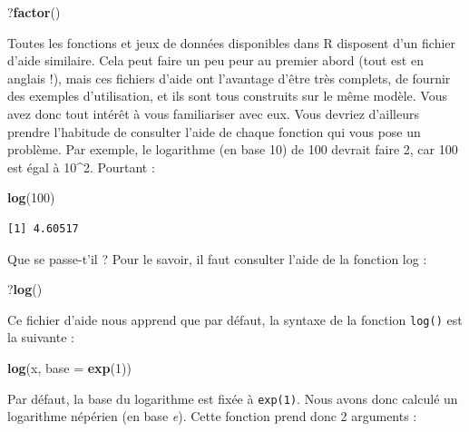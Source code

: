 \documentclass[
  a4paper,
]{article}
\newenvironment{Shaded}{\begin{snugshade}}{\end{snugshade}}
\newcommand{\DataTypeTok}[1]{\textcolor[rgb]{0.00,0.34,0.68}{#1}}
\newcommand{\DecValTok}[1]{\textcolor[rgb]{0.69,0.50,0.00}{#1}}
\newcommand{\KeywordTok}[1]{\textcolor[rgb]{0.12,0.11,0.11}{\textbf{#1}}}
\newcommand{\NormalTok}[1]{\textcolor[rgb]{0.12,0.11,0.11}{#1}}
\begin{document}
\begin{Shaded}
\begin{Highlighting}[]
\NormalTok{?}\KeywordTok{factor}\NormalTok{()}
\end{Highlighting}
\end{Shaded}

Toutes les fonctions et jeux de données disponibles dans R disposent d'un fichier d'aide similaire. Cela peut faire un peu peur au premier abord (tout est en anglais !), mais ces fichiers d'aide ont l'avantage d'être très complets, de fournir des exemples d'utilisation, et ils sont tous construits sur le même modèle. Vous avez donc tout intérêt à vous familiariser avec eux. Vous devriez d'ailleurs prendre l'habitude de consulter l'aide de chaque fonction qui vous pose un problème. Par exemple, le logarithme (en base 10) de 100 devrait faire 2, car 100 est égal à 10\^{}2. Pourtant :

\begin{Shaded}
\begin{Highlighting}[]
\KeywordTok{log}\NormalTok{(}\DecValTok{100}\NormalTok{)}
\end{Highlighting}
\end{Shaded}

\begin{verbatim}
[1] 4.60517
\end{verbatim}

Que se passe-t'il ? Pour le savoir, il faut consulter l'aide de la fonction log :

\begin{Shaded}
\begin{Highlighting}[]
\NormalTok{?}\KeywordTok{log}\NormalTok{()}
\end{Highlighting}
\end{Shaded}

Ce fichier d'aide nous apprend que par défaut, la syntaxe de la fonction \texttt{log()} est la suivante :

\begin{Shaded}
\begin{Highlighting}[]
\KeywordTok{log}\NormalTok{(x, }\DataTypeTok{base =} \KeywordTok{exp}\NormalTok{(}\DecValTok{1}\NormalTok{))}
\end{Highlighting}
\end{Shaded}

Par défaut, la base du logarithme est fixée à \texttt{exp(1)}. Nous avons donc calculé un logarithme népérien (en base \emph{e}). Cette fonction prend donc 2 arguments :
\end{document}
